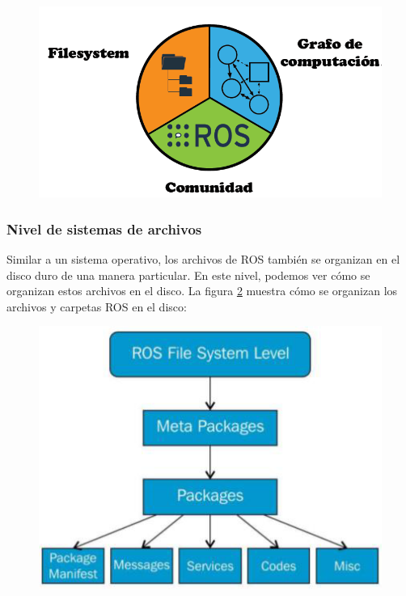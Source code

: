             \begin{figure}[htb]
                \centering
                \includegraphics[width=0.5\linewidth]{Main/Chapter3/Images3/nivel_s_a_1.png}
                \caption{}
                \label{f:Cap3_conceptos_1}
            \end{figure} 
            
            \subsubsection{Nivel de sistemas de archivos}
                Similar a un sistema operativo, los archivos de ROS también se organizan en el disco duro de una manera particular. En este nivel, podemos ver cómo se organizan estos archivos en el disco. La figura \ref{f:Cap3_conceptos_2} muestra cómo se organizan los archivos y carpetas ROS en el disco:
                
                
            \begin{figure}[htb]
                \centering
                \includegraphics[width=0.6\linewidth]{Main/Chapter3/Images3/n_s_a_2.png}
                \caption{}
                \label{f:Cap3_conceptos_2}
            \end{figure} 
                
                
               \newpage


